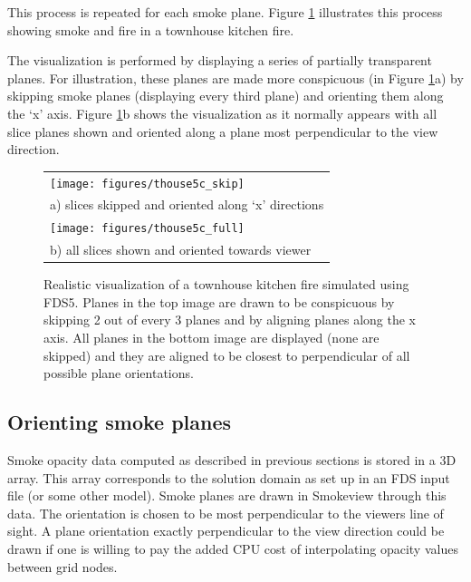 \noindent This process is repeated for each smoke plane. Figure
\ref{figsmoke3d} illustrates this process showing smoke and fire
in a townhouse kitchen fire.

The visualization is performed by displaying a series of partially
transparent planes. For illustration, these planes are made more
conspicuous (in Figure \ref{figsmoke3d}a) by skipping smoke planes
(displaying every third plane) and orienting them along the `x'
axis. Figure \ref{figsmoke3d}b shows the visualization as it
normally appears with all slice planes shown and oriented along a
plane most perpendicular to the view direction.
\begin{figure}[\figoptions]
\begin{center}
\begin{tabular}{l}
\texttt{[image: figures/thouse5c\_skip]}\\
a) slices skipped and oriented along `x' directions\\
\texttt{[image: figures/thouse5c\_full]}\\
b) all slices shown and oriented towards viewer \\
\end{tabular}
\end{center}
\caption{Realistic visualization of a townhouse kitchen fire simulated
using FDS5. Planes in the top image are drawn to be conspicuous by
skipping 2 out of every 3 planes and by aligning planes along the
x axis. All planes in the bottom image are displayed (none are
skipped) and they are aligned to be closest to perpendicular of
all possible plane orientations.
  }
\label{figsmoke3d}%
\end{figure}

%
%



%
%

\subsection{Orienting smoke planes}

Smoke opacity data computed as described in previous sections is
stored in a 3D array. This array corresponds to the solution
domain as set up in an FDS input file (or some other model). Smoke
planes are drawn in Smokeview through this data.  The orientation
is chosen to be most perpendicular to the viewers line of sight. A
plane orientation exactly perpendicular to the view direction
could be drawn if one is willing to pay the added CPU cost of
interpolating opacity values between grid nodes.

